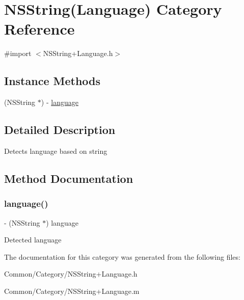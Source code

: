 \hypertarget{category_n_s_string_07_language_08}{}\section{N\+S\+String(Language) Category Reference}
\label{category_n_s_string_07_language_08}


{\ttfamily \#import $<$N\+S\+String+\+Language.\+h$>$}

\subsection*{Instance Methods}
\begin{DoxyCompactItemize}
\item 
(N\+S\+String $\ast$) -\/ \hyperlink{category_n_s_string_07_language_08_a68562907cfb8bb8554ccafd2665d5a4d}{language}
\end{DoxyCompactItemize}


\subsection{Detailed Description}
Detects language based on string 

\subsection{Method Documentation}
\hypertarget{category_n_s_string_07_language_08_a68562907cfb8bb8554ccafd2665d5a4d}{}\label{category_n_s_string_07_language_08_a68562907cfb8bb8554ccafd2665d5a4d} 
\subsubsection{\texorpdfstring{language()}{language()}}
{\footnotesize\ttfamily -\/ (N\+S\+String $\ast$) language \begin{DoxyParamCaption}{ }\end{DoxyParamCaption}}

Detected language 

The documentation for this category was generated from the following files\+:\begin{DoxyCompactItemize}
\item 
Common/\+Category/N\+S\+String+\+Language.\+h\item 
Common/\+Category/N\+S\+String+\+Language.\+m\end{DoxyCompactItemize}
